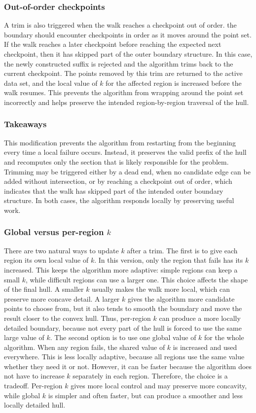 \documentclass[a4paper,twoside]{article}
\begin{document}
\subsubsection*{Out-of-order checkpoints}
A trim is also triggered when the walk reaches a checkpoint out of order. the boundary should encounter checkpoints in order as it moves around the point set. If the walk reaches a later checkpoint before reaching the expected next checkpoint, then it has skipped part of the outer boundary structure.
In this case, the newly constructed suffix is rejected and the algorithm trims back to the current checkpoint. The points removed by this trim are returned to the active data set, and the local value of \(k\) for the affected region is increased before the walk resumes. This prevents the algorithm from wrapping around the point set incorrectly and helps preserve the intended region-by-region traversal of the hull.
\subsubsection*{Takeaways}
This modification prevents the algorithm from restarting from the beginning every time a local failure occurs. Instead, it preserves the valid prefix of the hull and recomputes only the section that is likely responsible for the problem. Trimming may be triggered either by a dead end, when no candidate edge can be added without intersection, or by reaching a checkpoint out of order, which indicates that the walk has skipped part of the intended outer boundary structure. In both cases, the algorithm responds locally by preserving useful work.
\subsubsection*{Global versus per-region $k$}
There are two natural ways to update $k$ after a trim. The first is to give each
region its own local value of $k$. In this version, only the region that fails has
its $k$ increased. This keeps the algorithm more adaptive: simple regions can keep
a small $k$, while difficult regions can use a larger one.
This choice affects the shape of the final hull. A smaller $k$ usually makes the
walk more local, which can preserve more concave detail. A larger $k$ gives the
algorithm more candidate points to choose from, but it also tends to smooth the
boundary and move the result closer to the convex hull. Thus, per-region $k$ can
produce a more locally detailed boundary, because not every part of the hull is forced
to use the same large value of $k$.
The second option is to use one global value of $k$ for the whole algorithm. When
any region fails, the shared value of $k$ is increased and used everywhere. This is
less locally adaptive, because all regions use the same value whether they need it or
not. However, it can be faster because the algorithm does not have to increase $k$
separately in each region.
Therefore, the choice is a tradeoff. Per-region $k$ gives more local control and may
preserve more concavity, while global $k$ is simpler and often faster, but can
produce a smoother and less locally detailed hull.
\end{document}
